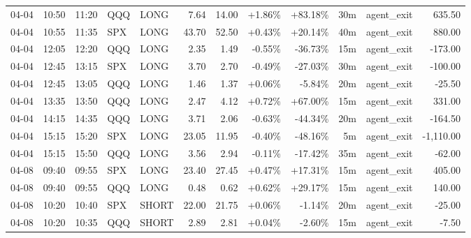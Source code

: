 \documentclass[11pt,a4paper]{article}
\begin{document}
\begin{center}
\begin{longtable}{>{\color{txtmain}}l l l l l r r r r r >{\color{txtmain}}l r}
04-04 & 10:50 & 11:20 & QQQ & LONG & 7.64 & 14.00 & \textcolor{wingreen}{+1.86\%} & \textcolor{wingreen}{+83.18\%} & 30m & agent\_exit & \textcolor{wingreen}{635.50} \\
04-04 & 10:55 & 11:35 & SPX & LONG & 43.70 & 52.50 & \textcolor{wingreen}{+0.43\%} & \textcolor{wingreen}{+20.14\%} & 40m & agent\_exit & \textcolor{wingreen}{880.00} \\
04-04 & 12:05 & 12:20 & QQQ & LONG & 2.35 & 1.49 & \textcolor{lossred}{-0.55\%} & \textcolor{lossred}{-36.73\%} & 15m & agent\_exit & \textcolor{lossred}{-173.00} \\
04-04 & 12:45 & 13:15 & SPX & LONG & 3.70 & 2.70 & \textcolor{lossred}{-0.49\%} & \textcolor{lossred}{-27.03\%} & 30m & agent\_exit & \textcolor{lossred}{-100.00} \\
04-04 & 12:45 & 13:05 & QQQ & LONG & 1.46 & 1.37 & \textcolor{wingreen}{+0.06\%} & \textcolor{lossred}{-5.84\%} & 20m & agent\_exit & \textcolor{lossred}{-25.50} \\
04-04 & 13:35 & 13:50 & QQQ & LONG & 2.47 & 4.12 & \textcolor{wingreen}{+0.72\%} & \textcolor{wingreen}{+67.00\%} & 15m & agent\_exit & \textcolor{wingreen}{331.00} \\
04-04 & 14:15 & 14:35 & QQQ & LONG & 3.71 & 2.06 & \textcolor{lossred}{-0.63\%} & \textcolor{lossred}{-44.34\%} & 20m & agent\_exit & \textcolor{lossred}{-164.50} \\
04-04 & 15:15 & 15:20 & SPX & LONG & 23.05 & 11.95 & \textcolor{lossred}{-0.40\%} & \textcolor{lossred}{-48.16\%} & 5m & agent\_exit & \textcolor{lossred}{-1,110.00} \\
04-04 & 15:15 & 15:50 & QQQ & LONG & 3.56 & 2.94 & \textcolor{lossred}{-0.11\%} & \textcolor{lossred}{-17.42\%} & 35m & agent\_exit & \textcolor{lossred}{-62.00} \\
04-08 & 09:40 & 09:55 & SPX & LONG & 23.40 & 27.45 & \textcolor{wingreen}{+0.47\%} & \textcolor{wingreen}{+17.31\%} & 15m & agent\_exit & \textcolor{wingreen}{405.00} \\
04-08 & 09:40 & 09:55 & QQQ & LONG & 0.48 & 0.62 & \textcolor{wingreen}{+0.62\%} & \textcolor{wingreen}{+29.17\%} & 15m & agent\_exit & \textcolor{wingreen}{140.00} \\
04-08 & 10:20 & 10:40 & SPX & SHORT & 22.00 & 21.75 & \textcolor{wingreen}{+0.06\%} & \textcolor{lossred}{-1.14\%} & 20m & agent\_exit & \textcolor{lossred}{-25.00} \\
04-08 & 10:20 & 10:35 & QQQ & SHORT & 2.89 & 2.81 & \textcolor{wingreen}{+0.04\%} & \textcolor{lossred}{-2.60\%} & 15m & agent\_exit & \textcolor{lossred}{-7.50} \\

\end{longtable}
\end{center}
\end{document}
